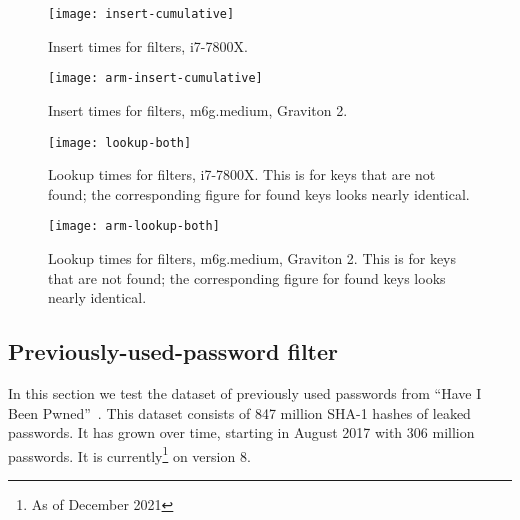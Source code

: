 \documentclass[letterpaper,twocolumn,10pt]{article}
\begin{document}
\begin{figure}[b!]
  \texttt{[image: insert-cumulative]}
  \caption{
    \label{insert-time}
    Insert times for filters, i7-7800X.
  }
\end{figure}

\begin{figure}[b!]
  \texttt{[image: arm-insert-cumulative]}
  \caption{
    \label{arm-insert-time}
    Insert times for filters, m6g.medium, Graviton 2.
  }
\end{figure}

\begin{figure}[b!]
  \texttt{[image: lookup-both]}
  \caption{
    \label{lookup-both}
    Lookup times for filters, i7-7800X.
    This is for keys that are not found; the corresponding figure for found keys looks nearly identical.
  }
\end{figure}

\begin{figure}[b!]
  \texttt{[image: arm-lookup-both]}
  \caption{
    \label{arm-lookup-both}
    Lookup times for filters, m6g.medium, Graviton 2.
    This is for keys that are not found; the corresponding figure for found keys looks nearly identical.
  }
\end{figure}


\subsection{Previously-used-password filter}
\label{hibp}

In this section we test the dataset of previously used passwords from ``Have I Been Pwned''~\cite{pwned}.
This dataset consists of 847 million SHA-1 hashes of leaked passwords.
It has grown over time, starting in August 2017 with 306 million passwords. It is currently\footnote{As of December 2021} on version 8.
\end{document}
